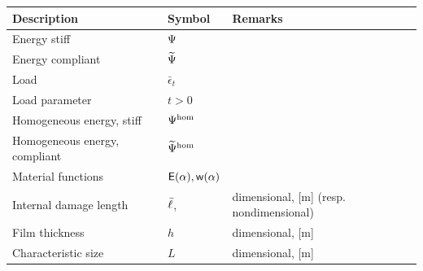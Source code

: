 
\begin{table}[h!]
    \centering
    \begin{tabular}{  m{}  m{3cm}  m{5.5cm}  }
        \hline
        \textbf{Description}                & \textbf{Symbol}                                    & \textbf{Remarks}                                                                \\
        \hline
        Energy stiff                        & $\Psi$                                          &                                                                                 \\
        Energy compliant                    & $\widetilde\Psi$                                          &                                                                                 \\
        Load                                & $\bar\epsilon_t$                                   &                                                                                 \\
        Load parameter                      & $t>0$                                              &                                                                                 \\
        Homogeneous energy, stiff           & $\Psi^\text{hom}$                                       &                                                                                 \\
        Homogeneous energy, compliant       & $\widetilde\Psi^\text{hom}$                                       &                                                                                 \\
        Material functions                  & $\mathsf E(\alpha), \mathsf{w}(\alpha)$            &                                                                                 \\
        Internal damage length              & $\bar{\ell}$, \albadd{($\ell$)}                 & dimensional, [m] (resp. nondimensional)                                         \\
        Film thickness                      & $h$                                                & dimensional, [m]                                                                \\
        Characteristic size                 & $L$                                                & dimensional, [m]                                                                \\

\end{tabular}
\end{table}
